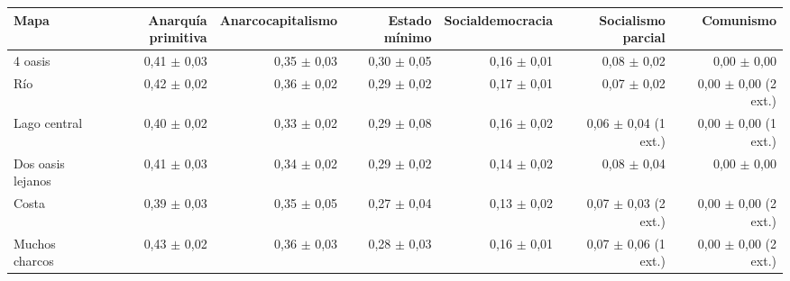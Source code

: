 \begin{tabular}{lrrrrrr}
\toprule
Mapa & Anarquía primitiva & Anarcocapitalismo & Estado mínimo & Socialdemocracia & Socialismo parcial & Comunismo \\
\midrule
4 oasis & 0,41 $\pm$ 0,03 & 0,35 $\pm$ 0,03 & 0,30 $\pm$ 0,05 & 0,16 $\pm$ 0,01 & 0,08 $\pm$ 0,02 & 0,00 $\pm$ 0,00 \\
Río & 0,42 $\pm$ 0,02 & 0,36 $\pm$ 0,02 & 0,29 $\pm$ 0,02 & 0,17 $\pm$ 0,01 & 0,07 $\pm$ 0,02 & 0,00 $\pm$ 0,00 (2 ext.) \\
Lago central & 0,40 $\pm$ 0,02 & 0,33 $\pm$ 0,02 & 0,29 $\pm$ 0,08 & 0,16 $\pm$ 0,02 & 0,06 $\pm$ 0,04 (1 ext.) & 0,00 $\pm$ 0,00 (1 ext.) \\
Dos oasis lejanos & 0,41 $\pm$ 0,03 & 0,34 $\pm$ 0,02 & 0,29 $\pm$ 0,02 & 0,14 $\pm$ 0,02 & 0,08 $\pm$ 0,04 & 0,00 $\pm$ 0,00 \\
Costa & 0,39 $\pm$ 0,03 & 0,35 $\pm$ 0,05 & 0,27 $\pm$ 0,04 & 0,13 $\pm$ 0,02 & 0,07 $\pm$ 0,03 (2 ext.) & 0,00 $\pm$ 0,00 (2 ext.) \\
Muchos charcos & 0,43 $\pm$ 0,02 & 0,36 $\pm$ 0,03 & 0,28 $\pm$ 0,03 & 0,16 $\pm$ 0,01 & 0,07 $\pm$ 0,06 (1 ext.) & 0,00 $\pm$ 0,00 (2 ext.) \\
\bottomrule
\end{tabular}
